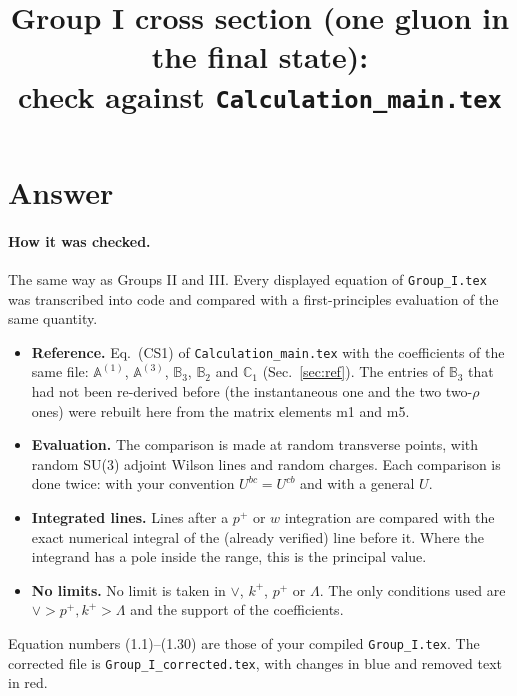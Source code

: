 \documentclass[10pt]{article}
\title{Group I cross section (one gluon in the final state):\\ check against \texttt{Calculation\_main.tex}}
\date{}
\numberwithin{equation}{section}
\def\mf#1{\mathbb{#1}}
\begin{document}
\maketitle
\tableofcontents

\section{Answer}\label{sec:answer}
\paragraph{How it was checked.} The same way as Groups II and III. Every displayed equation of \texttt{Group\_I.tex} was transcribed into code and compared with a first-principles evaluation of the same quantity.
\begin{itemize}
\item \textbf{Reference.} Eq.~(CS1) of \texttt{Calculation\_main.tex} with the coefficients of the same file: $\mf A^{(1)}$, $\mf A^{(3)}$, $\mf B_3$, $\mf B_2$ and $\mf C_1$ (Sec.~\ref{sec:ref}). The entries of $\mf B_3$ that had not been re-derived before (the instantaneous one and the two two-$\rho$ ones) were rebuilt here from the matrix elements m1 and m5.
\item \textbf{Evaluation.} The comparison is made at random transverse points, with random SU(3) adjoint Wilson lines and random charges. Each comparison is done twice: with your convention $U^{bc}=U^{cb}$ and with a general $U$.
\item \textbf{Integrated lines.} Lines after a $p^+$ or $w$ integration are compared with the exact numerical integral of the (already verified) line before it. Where the integrand has a pole inside the range, this is the principal value.
\item \textbf{No limits.} No limit is taken in $\vee$, $k^+$, $p^+$ or $\Lambda$. The only conditions used are $\vee>p^+,k^+>\Lambda$ and the support of the coefficients.
\end{itemize}
Equation numbers (1.1)--(1.30) are those of your compiled \texttt{Group\_I.tex}. The corrected file is \texttt{Group\_I\_corrected.tex}, with changes in blue and removed text in red.
\end{document}
